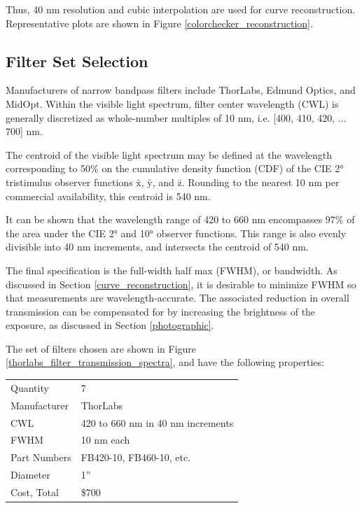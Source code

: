 \documentclass[twocolumn,10pt]{asme2ej}
\newcommand{\id}{\hspace{6 mm}}
\begin{document}
Thus, 40 nm resolution and cubic interpolation are used for curve reconstruction. Representative plots are shown in Figure \ref{colorchecker_reconstruction}.

\subsection{Filter Set Selection}

\label{section_filters}

Manufacturers of narrow bandpass filters include ThorLabs, Edmund Optics, and MidOpt. Within the visible light spectrum, filter center wavelength (CWL) is generally discretized as whole-number multiples of 10 nm, i.e. [400, 410, 420, ... 700] nm.

\id The centroid of the visible light spectrum may be defined at the wavelength corresponding to 50\% on the cumulative density function (CDF) of the CIE 2° tristimulus observer functions $\mathrm{\bar{x}}$, $\mathrm{\bar{y}}$, and $\mathrm{\bar{z}}$. Rounding to the nearest 10 nm per commercial availability, this centroid is 540 nm.

\id It can be shown that the wavelength range of 420 to 660 nm encompasses 97\% of the area under the CIE 2° and 10° observer functions. This range is also evenly divisible into 40 nm increments, and intersects the centroid of 540 nm.

\id The final specification is the full-width half max (FWHM), or bandwidth. As discussed in Section \ref{curve_reconstruction}, it is desirable to minimize FWHM so that measurements are wavelength-accurate. The associated reduction in overall transmission can be compensated for by increasing the brightness of the exposure, as discussed in Section \ref{photographic}.

\id The set of filters chosen are shown in Figure \ref{thorlabs_filter_transmission_spectra}, and have the following properties:\\

\begin{tabular}{l | l}
Quantity & 7 \\
Manufacturer & ThorLabs \\
CWL & 420 to 660 nm in 40 nm increments \\
FWHM & 10 nm each \\
Part Numbers & FB420-10, FB460-10, etc. \\
Diameter & 1'' \\
Cost, Total & \$700 \\
\end{tabular}
\end{document}
